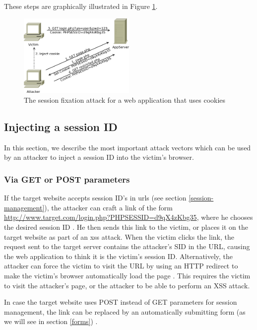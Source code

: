 These steps are graphically illustrated in Figure \ref{fig:fixation}.

\begin{figure}[htb]
	\centering
	\includegraphics[width=0.50\textwidth]{img/fixation.png}
	\caption[The session fixation attack]{The session fixation attack for a web application that uses cookies}
	\label{fig:fixation}
\end{figure}

\subsection{Injecting a session ID}\label{injecting-sid}

In this section, we describe the most important \glspl{attack vector} which can be used by an attacker to inject a session ID into the victim's browser.

\subsubsection{Via GET or POST parameters}\label{get-or-post}

If the target website accepts session ID's in \glspl{url} (see section \ref{session-management}), the attacker can craft a link of the form \url{http://www.target.com/login.php?PHPSESSID=d9qX4zKbg35}, where he chooses the desired session ID \cite{Johns2011}. He then sends this link to the victim, or places it on the target website as part of an \gls{xss} attack. When the victim clicks the link, the request sent to the target server contains the attacker's SID in the URL, causing the web application to think it is the victim's session ID. Alternatively, the attacker can force the victim to visit the URL by using an HTTP redirect \cite{rfc2616} to make the victim's browser automatically load the page \cite{Shiflett2004}. This requires the victim to visit the attacker's page, or the attacker to be able to perform an XSS attack.

In case the target website uses POST instead of GET parameters for session management, the link can be replaced by an automatically submitting form (as we will see in section \ref{forms}) \cite{Kolsek2002,Bontrager2005}.

